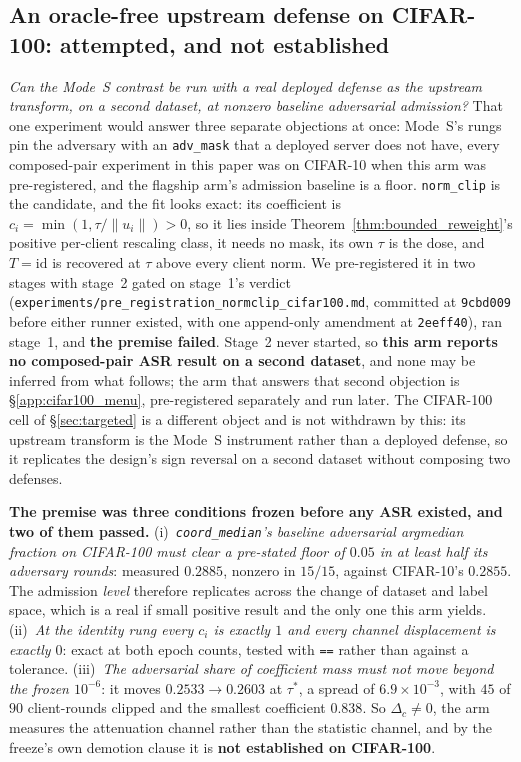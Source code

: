 \documentclass{article}
\begin{document}
\subsection{An oracle-free upstream defense on CIFAR-100: attempted, and not established}
\label{app:normclip_cifar100}

\noindent \emph{Can the Mode~S contrast be run with a real deployed defense as the upstream transform, on a second dataset, at nonzero baseline adversarial admission?} That one experiment would answer three separate objections at once: Mode~S's rungs pin the adversary with an \texttt{adv\_mask} that a deployed server does not have, every composed-pair experiment in this paper was on CIFAR-10 when this arm was pre-registered, and the flagship arm's admission baseline is a floor. \texttt{norm\_clip} is the candidate, and the fit looks exact: its coefficient is $c_i=\min(1,\tau/\lVert u_i\rVert)>0$, so it lies inside Theorem~\ref{thm:bounded_reweight}'s positive per-client rescaling class, it needs no mask, its own $\tau$ is the dose, and $T{=}\mathrm{id}$ is recovered at $\tau$ above every client norm. We pre-registered it in two stages with stage~2 gated on stage~1's verdict (\texttt{experiments/pre\_\allowbreak registration\_\allowbreak normclip\_\allowbreak cifar100.md}, committed at \texttt{9cbd009} before either runner existed, with one append-only amendment at \texttt{2eeff40}), ran stage~1, and \textbf{the premise failed}. Stage~2 never started, so \textbf{this arm reports no composed-pair ASR result on a second dataset}, and none may be inferred from what follows; the arm that answers that second objection is §\ref{app:cifar100_menu}, pre-registered separately and run later. The CIFAR-100 cell of §\ref{sec:targeted} is a different object and is not withdrawn by this: its upstream transform is the Mode~S instrument rather than a deployed defense, so it replicates the design's sign reversal on a second dataset without composing two defenses.

\textbf{The premise was three conditions frozen before any ASR existed, and two of them passed.} (i)~\emph{\texttt{coord\_median}'s baseline adversarial argmedian fraction on CIFAR-100 must clear a pre-stated floor of $0.05$ in at least half its adversary rounds}: measured $0.2885$, nonzero in $15/15$, against CIFAR-10's $0.2855$. The admission \emph{level} therefore replicates across the change of dataset and label space, which is a real if small positive result and the only one this arm yields. (ii)~\emph{At the identity rung every $c_i$ is exactly $1$ and every channel displacement is exactly $0$}: exact at both epoch counts, tested with \texttt{==} rather than against a tolerance. (iii)~\emph{The adversarial share of coefficient mass must not move beyond the frozen $10^{-6}$}: it moves $0.2533 \to 0.2603$ at $\tau^\ast$, a spread of $6.9{\times}10^{-3}$, with $45$ of $90$ client-rounds clipped and the smallest coefficient $0.838$. So $\Delta_c \ne 0$, the arm measures the attenuation channel rather than the statistic channel, and by the freeze's own demotion clause it is \textbf{not established on CIFAR-100}.
\end{document}
